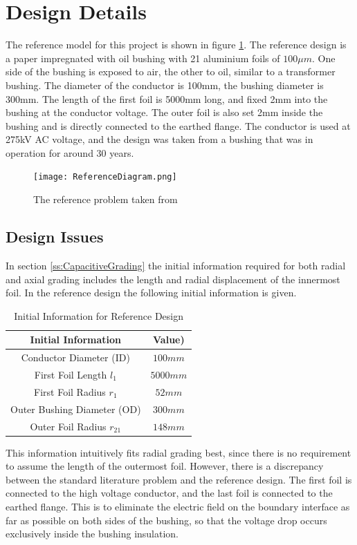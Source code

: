\section{Design Details}
The reference model for this project is shown in figure \ref{figure:refproblem}. 
The reference design is a paper impregnated with oil bushing with 21 aluminium foils of $100\mu m$.
One side of the bushing is exposed to air, the other to oil, similar to a transformer bushing.
The diameter of the conductor is 100mm, the bushing diameter is 300mm.
The length of the first foil is 5000mm long, and fixed 2mm into the bushing at the conductor voltage.
The outer foil is also set 2mm inside the bushing and is directly connected to the earthed flange.
The conductor is used at 275kV AC voltage, and the design was taken from a bushing that was in operation for around 30 years.
\begin{figure}[!h]
   \centering
   \texttt{[image: ReferenceDiagram.png]}
   \caption{The reference problem taken from \cite{Chen14}}
   \label{figure:refproblem}
\end{figure}

\subsection{Design Issues}
In section \ref{ss:CapacitiveGrading} the initial information required for both radial and axial grading includes the length and radial displacement of the innermost foil.
In the reference design the following initial information is given.

\begin{table}[!htb]
\caption{Initial Information for Reference Design}
\label{table:initinfo}
\begin{center}
\begin{tabular}{cc}
\toprule
\textbf{Initial Information} & \textbf{Value)} \\ \toprule
Conductor Diameter (ID) & $100mm$ \\
First Foil Length $l_1$ & $5000mm$ \\
First Foil Radius $r_1$&$52mm$ \\
Outer Bushing Diameter (OD) & $300mm$\\
Outer Foil Radius $r_21$ & $148mm$\\
\bottomrule
\end{tabular}
\end{center}
\end{table} 

This information intuitively fits radial grading best, since there is no requirement to assume the length of the outermost foil.
However, there is a discrepancy between the standard literature problem and the reference design.
The first foil is connected to the high voltage conductor, and the last foil is connected to the earthed flange.
This is to eliminate the electric field on the boundary interface as far as possible on both sides of the bushing, so that the voltage drop occurs exclusively inside the bushing insulation.

